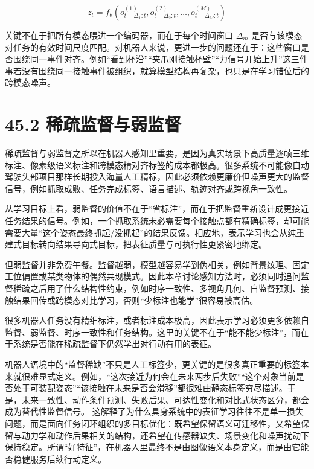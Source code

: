 \begingroup
\scriptsize
\begin{equation*}
z_t = f_\theta\left(o_{t-\Delta_1:t}^{(1)}, o_{t-\Delta_2:t}^{(2)}, \dots, o_{t-\Delta_M:t}^{(M)}\right)
\end{equation*}
\endgroup

关键不在于把所有模态喂进一个编码器，而在于每个时间窗口 \(\Delta_m\) 是否与该模态对任务的有效时间尺度匹配。对机器人来说，更进一步的问题还在于：这些窗口是否围绕同一事件对齐。例如“看到杯沿”“夹爪刚接触杯壁”“力信号开始上升”这三件事若没有围绕同一接触事件被组织，就算模型结构再复杂，也只是在学习错位后的跨模态噪声。

\section*{45.2 稀疏监督与弱监督}


稀疏监督与弱监督之所以在机器人感知里重要，是因为真实场景下高质量逐帧三维标注、像素级语义标注和跨模态精对齐标签的成本都极高。很多系统不可能像自动驾驶头部项目那样长期投入海量人工精标，因此必须依赖更廉价但噪声更大的监督信号，例如抓取成败、任务完成标签、语言描述、轨迹对齐或跨视角一致性。

从学习目标上看，弱监督的价值不在于“省标注”，而在于把监督重新设计成更接近任务结果的信号。例如，一个抓取系统未必需要每个接触点都有精确标签，却可能需要大量“这个姿态最终抓起/没抓起”的结果反馈。相应地，表示学习也会从纯重建式目标转向结果导向式目标，把表征质量与可执行性更紧密地绑定。

但弱监督并非免费午餐。监督越弱，模型越容易学到伪相关，例如背景纹理、固定工位偏置或某类物体的偶然共现模式。因此本章讨论感知方法时，必须同时追问监督稀疏之后用了什么结构性约束，例如时序一致性、多视角几何、自监督预测、接触结果回传或跨模态对比学习，否则“少标注也能学”很容易被高估。

很多机器人任务没有精细标注，或者标注成本极高，因此表示学习必须更多依赖自监督、弱监督、时序一致性和任务结构。这里的关键不在于“能不能少标注”，而在于系统是否能在稀疏监督下仍然学出对行动有用的表征。

机器人语境中的“监督稀缺”不只是人工标签少，更关键的是很多真正重要的标签本来就很难显式定义。例如，“这次接近为何会在未来两步后失败”“这个对象当前是否处于可装配姿态”“该接触在未来是否会滑移”都很难由静态标签穷尽描述。于是，未来一致性、动作条件预测、失败后果、可达性变化和对比式状态区分，都会成为替代性监督信号。 这解释了为什么具身系统中的表征学习往往不是单一损失问题，而是面向任务闭环组织的多目标优化：既希望保留语义可迁移性，又希望保留与动力学和动作后果相关的结构，还希望在传感器缺失、场景变化和噪声扰动下保持稳定。所谓“好特征”，在机器人里最终不是由图像语义本身定义，而是由它能否稳健服务后续行动定义。

